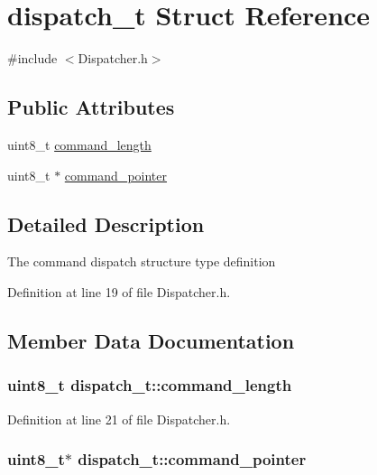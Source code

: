 \hypertarget{structdispatch__t}{\section{dispatch\-\_\-t \-Struct \-Reference}
\label{structdispatch__t}
}


{\ttfamily \#include $<$\-Dispatcher.\-h$>$}

\subsection*{\-Public \-Attributes}
\begin{DoxyCompactItemize}
\item 
uint8\-\_\-t \hyperlink{structdispatch__t_a5d402e61a328a433b3d2ba5e55d0c3c9}{command\-\_\-length}
\item 
uint8\-\_\-t $\ast$ \hyperlink{structdispatch__t_a052b015d03a27d58f92fb2d0f5f3f2b1}{command\-\_\-pointer}
\end{DoxyCompactItemize}


\subsection{\-Detailed \-Description}
\-The command dispatch structure type definition 

\-Definition at line 19 of file \-Dispatcher.\-h.



\subsection{\-Member \-Data \-Documentation}
\hypertarget{structdispatch__t_a5d402e61a328a433b3d2ba5e55d0c3c9}{
\subsubsection[{command\-\_\-length}]{\setlength{\rightskip}{0pt plus 5cm}uint8\-\_\-t {\bf dispatch\-\_\-t\-::command\-\_\-length}}}\label{structdispatch__t_a5d402e61a328a433b3d2ba5e55d0c3c9}


\-Definition at line 21 of file \-Dispatcher.\-h.

\hypertarget{structdispatch__t_a052b015d03a27d58f92fb2d0f5f3f2b1}{
\subsubsection[{command\-\_\-pointer}]{\setlength{\rightskip}{0pt plus 5cm}uint8\-\_\-t$\ast$ {\bf dispatch\-\_\-t\-::command\-\_\-pointer}}}\label{structdispatch__t_a052b015d03a27d58f92fb2d0f5f3f2b1}


